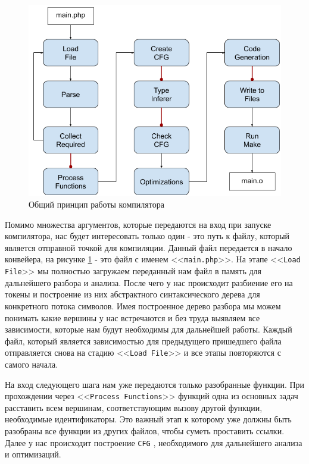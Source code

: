 \begin{figure}[H]
    \caption{Общий принцип работы компилятора}
    \label{fig:compiler_arch}
    \centering
    \includegraphics[width=\linewidth]{images/compiler_arch}
\end{figure}  

Помимо множества аргументов, которые передаются на вход при запуске компилятора, нас будет интересовать только один - это путь к файлу, который является отправной точкой для компиляции.
Данный файл передается в начало конвейера, на рисунке \ref{fig:compiler_arch} - это файл с именем <<\verb|main.php|>>.
На этапе <<\verb|Load File|>> мы полностью загружаем переданный нам файл в память для дальнейшего разбора и анализа.
После чего у нас происходит разбиение его на токены и построение из них абстрактного синтаксического дерева для конкретного потока символов.
Имея построенное дерево разбора мы можем понимать какие вершины у нас встречаются и без труда выявляем все зависимости, которые нам будут необходимы для дальнейшей работы. 
Каждый файл, который является зависимостью для предыдущего пришедшего файла отправляется снова на стадию <<\verb|Load File|>> и все этапы повторяются с самого начала.

На вход следующего шага нам уже передаются только разобранные функции.
При прохождении через <<\verb|Process Functions|>>  функций одна из основных задач расставить всем вершинам, соответствующим вызову другой функции, необходимые идентификаторы.
Это важный этап к которому уже должны быть разобраны все функции из других файлов, чтобы суметь проставить ссылки. Далее у нас происходит построение \verb|CFG| \cite{CFG}, необходимого для дальнейшего анализа и оптимизаций.

